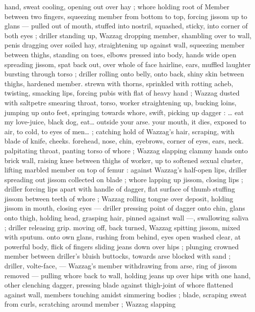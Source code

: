 hand, sweat cooling, opening out over hay ; whore holding root of 
Member between two fingers, squeezing member from bottom to top, 
forcing jissom up to glans --- pulled out of mouth, stuffed into 
nostril, squashed, sticky, into corner of both eyes ; driller standing 
up, Wazzag dropping member, shambling over to wall, penis dragging 
over soiled hay, straightening up against wall, squeezing member 
between thighs, standing on toes, elbows pressed into body, hands 
wide open spreading jissom, spat back out, over whole of face 
hairline, ears, muffled laughter bursting through torso ; driller rolling 
onto belly, onto back, shiny skin between thighs, hardened member. 
strewn with thorns, sprinkled with rotting acheb, twisting, smacking 
lips, forcing pubis with flat of heavy hand ; Wazzag dusted with 
saltpetre smearing throat, torso, worker straightening up, bucking 
loins, jumping up onto feet, springing towards whore, swift, picking 
up dagger : {\gl}{\ldots} eat my love-juice, black dog, eat{\ldots} outside your arse. 
your mouth, it dies, exposed to air, to cold, to eyes of men{\ldots}{\gr} ; 
catching hold of Wazzag's hair, scraping, with blade of knife, cheeks. 
forehead, nose, chin, eyebrows, corner of eyes, ears, neck. 
palpitating throat, panting torso of whore ; Wazzag slapping clammy 
hands onto brick wall, raising knee between thighs of worker, up to 
softened sexual cluster, lifting marbled member on top of femur : 
against Wazzag's half-open lips, driller spreading out jissom 
collected on blade ; whore lapping up jissom, closing lips ; driller 
forcing lips apart with handle of dagger, flat surface of thumb 
stuffing jissom between teeth of whore ; Wazzag rolling tongue over 
deposit, holding jissom in mouth, closing eyes --- driller pressing 
point of dagger onto chin, glans onto thigh, holding head, grasping 
hair, pinned against wall ---, swallowing saliva ; driller releasing grip. 
moving off, back turned, Wazzag spitting jissom, mixed with sputum. 
onto own glans, rushing from behind, eyes open washed clear, at 
powerful body, flick of fingers sliding jeans down over hips ; plunging 
crowned member between driller's bluish buttocks, towards arse 
blocked with sand ; driller, volte-face, --- Wazzag's member 
withdrawing from arse, ring of jissom removed --- pulling whore back 
to wall, holding jeans up over hips with one hand, other clenching 
dagger, pressing blade against thigh-joint of whore flattened against 
wall, members touching amidst simmering bodies ; blade, scraping 
sweat from curls, scratching around member ; Wazzag slapping 
